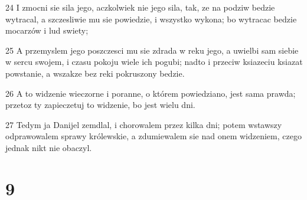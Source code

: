 \par 24 I zmocni sie sila jego, aczkolwiek nie jego sila, tak, ze na podziw bedzie wytracal, a szczesliwie mu sie powiedzie, i wszystko wykona; bo wytracac bedzie mocarzów i lud swiety;
\par 25 A przemyslem jego poszczesci mu sie zdrada w reku jego, a uwielbi sam siebie w sercu swojem, i czasu pokoju wiele ich pogubi; nadto i przeciw ksiazeciu ksiazat powstanie, a wszakze bez reki pokruszony bedzie.
\par 26 A to widzenie wieczorne i poranne, o którem powiedziano, jest sama prawda; przetoz ty zapieczetuj to widzenie, bo jest wielu dni.
\par 27 Tedym ja Danijel zemdlal, i chorowalem przez kilka dni; potem wstawszy odprawowalem sprawy królewskie, a zdumiewalem sie nad onem widzeniem, czego jednak nikt nie obaczyl.

\chapter{9}


